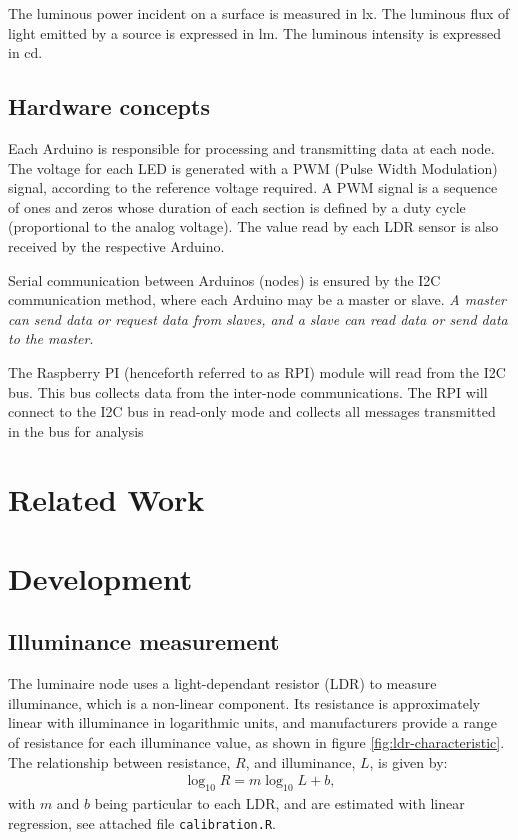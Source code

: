 \documentclass[english,fira]{ist-report}
\begin{document}
The luminous power incident on a surface is measured in \si{\lux}. The luminous flux of light emitted by a source is expressed in \si{\lumen}. The luminous intensity is expressed in \si{\candela}.

\subsection{Hardware concepts}

Each Arduino is responsible for processing and transmitting data at each node. The voltage for each LED is generated with a PWM (Pulse Width Modulation) signal, according to the reference voltage required. A PWM signal is a sequence of ones and zeros whose duration of each section is defined by a duty cycle (proportional to the analog voltage). The value read by each LDR sensor is also received by the respective Arduino.

Serial communication between Arduinos (nodes) is ensured by the I2C communication method, where each Arduino may be a master or slave. \textit{A master can send data or request data from slaves, and a slave can read data or send data to the master}.

The Raspberry PI (henceforth referred to as RPI) module will read from the I2C bus. This bus collects data from the inter-node communications. The RPI will connect to the I2C bus in read-only mode and collects all messages transmitted in the bus for analysis 

\section{Related Work}



\section{Development} \label{development}

\subsection{Illuminance measurement}

The luminaire node uses a light-dependant resistor (LDR) to measure illuminance, which is a non-linear component. 
Its resistance is approximately linear with illuminance in logarithmic units, and manufacturers provide a range of resistance for each illuminance value, as shown in figure \ref{fig:ldr-characteristic}.
The relationship between resistance, $R$, and illuminance, $L$, is given by:
\begin{align}
    \log_{10} R = m \log_{10} L + b, \label{eq:r-l-log}
\end{align}
with $m$ and $b$ being particular to each LDR, and are estimated with linear regression, see attached file \texttt{calibration.R}.
\end{document}
